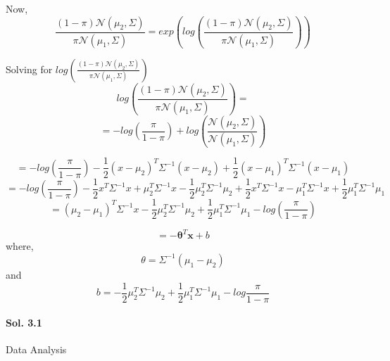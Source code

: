 \documentclass[]{report}
\begin{document}
		Now, 
		\[ \frac{(1 - \pi) \mathcal{N}(\mu_2, \Sigma)}{\pi \mathcal{N}(\mu_1, \Sigma)} = exp(log(\frac{(1 - \pi) \mathcal{N}(\mu_2, \Sigma)}{\pi \mathcal{N}(\mu_1, \Sigma)}))\]



		Solving for $log(\frac{(1 - \pi) \mathcal{N}(\mu_2, \Sigma)}{\pi \mathcal{N}(\mu_1, \Sigma)})$
		\[ log(\frac{(1 - \pi) \mathcal{N}(\mu_2, \Sigma)}{\pi \mathcal{N}(\mu_1, \Sigma)}) = \]
		\[ = - log(\frac{\pi}{1 - \pi}) + log(\frac{\mathcal{N}(\mu_2, \Sigma)}{\mathcal{N}(\mu_1, \Sigma)})\]

		\[ = -log(\frac{\pi}{1 - \pi}) -\frac{1}{2}(x- \mu_2)^T \Sigma^{-1}(x-\mu_2) + \frac{1}{2}(x- \mu_1)^T \Sigma^{-1}(x-\mu_1) \]
		\[ = -log(\frac{\pi}{1 - \pi}) - \frac{1}{2}{x^T}{\Sigma^{-1}}{x} + {\mu_2^T}{\Sigma^{-1}}{x} - \frac{1}{2}{\mu_2^T}{\Sigma^{-1}}{\mu_2} + \frac{1}{2}{x^T}{\Sigma^{-1}}{x} - {\mu_1^T}{\Sigma^{-1}}{x} + \frac{1}{2}{\mu_1^T}{\Sigma^{-1}}{\mu_1} \]
		\[ = (\mu_2 - \mu_1)^T \Sigma^{-1} x - \frac{1}{2}{\mu_2^T}{\Sigma^{-1}}{\mu_2} + \frac{1}{2}{\mu_1^T}{\Sigma^{-1}}{\mu_1} - log(\frac{\pi}{1 - \pi})\]
		
		\[ = - \boldsymbol{\theta}^{T} \textbf{x} + b \]
		where,
		\[ \theta = \Sigma^{-1}(\mu_1 - \mu_2)\]
		and 
		\[ b = -\frac{1}{2} \mu_2^T \Sigma^{-1} \mu_2  +\frac{1}{2} \mu_1^T \Sigma^{-1} \mu_1 - log \frac{\pi}{1 - \pi}\]

	\paragraph{Sol. 3.1}
		Data Analysis\\ 
		
\end{document}
